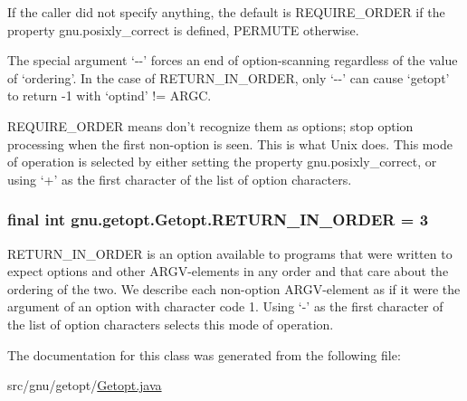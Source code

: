 If the caller did not specify anything, the default is REQUIRE\_\-ORDER if the property gnu.posixly\_\-correct is defined, PERMUTE otherwise.

The special argument `-\/-\/' forces an end of option-\/scanning regardless of the value of `ordering'. In the case of RETURN\_\-IN\_\-ORDER, only `-\/-\/' can cause `getopt' to return -\/1 with `optind' != ARGC.

REQUIRE\_\-ORDER means don't recognize them as options; stop option processing when the first non-\/option is seen. This is what Unix does. This mode of operation is selected by either setting the property gnu.posixly\_\-correct, or using `+' as the first character of the list of option characters. \hypertarget{classgnu_1_1getopt_1_1_getopt_a1c175740e7a8b309f46ac10259eeea11}{
\subsubsection[{RETURN\_\-IN\_\-ORDER}]{\setlength{\rightskip}{0pt plus 5cm}final int {\bf gnu.getopt.Getopt.RETURN\_\-IN\_\-ORDER} = 3}}
\label{classgnu_1_1getopt_1_1_getopt_a1c175740e7a8b309f46ac10259eeea11}
RETURN\_\-IN\_\-ORDER is an option available to programs that were written to expect options and other ARGV-\/elements in any order and that care about the ordering of the two. We describe each non-\/option ARGV-\/element as if it were the argument of an option with character code 1. Using `-\/' as the first character of the list of option characters selects this mode of operation. 

The documentation for this class was generated from the following file:\begin{DoxyCompactItemize}
\item 
src/gnu/getopt/\hyperlink{_getopt_8java}{Getopt.java}\end{DoxyCompactItemize}
